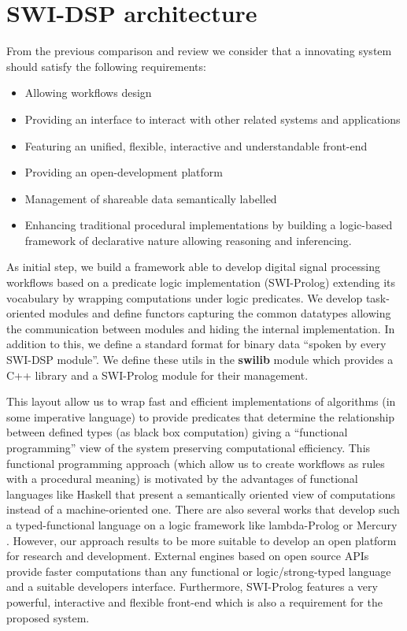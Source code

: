\documentclass[runningheads]{llncs}
\begin{document}
\section{SWI-DSP architecture}\label{sec:architecture}

From the previous comparison and review we consider that a innovating system should satisfy the following requirements:

\begin{itemize}
 \item Allowing workflows design
 \item Providing an interface to interact with other related systems and applications
 \item Featuring an unified, flexible, interactive and understandable front-end
 \item Providing an open-development platform
 \item Management of shareable data semantically labelled
 \item Enhancing traditional procedural implementations by building a logic-based framework of declarative nature allowing reasoning and inferencing.
\end{itemize}

As initial step, we build a framework able to develop digital signal processing workflows based on a predicate logic implementation (SWI-Prolog) extending its vocabulary by wrapping computations under logic predicates. We develop task-oriented modules and define functors capturing the common datatypes allowing the communication between modules and hiding the internal implementation. In addition to this, we define a standard format for binary data ``spoken by every SWI-DSP module''. We define these utils in the \textbf{swilib} module which provides a C++ library and a SWI-Prolog module for their management.

This layout allow us to wrap fast and efficient implementations of algorithms (in some imperative language) to provide predicates that determine the relationship between defined types (as black box computation) giving a ``functional programming'' view of the system preserving computational efficiency. This functional programming approach (which allow us to create workflows as rules with a procedural meaning) is motivated by the advantages of functional languages like Haskell \cite{haskell} that present a semantically oriented view of computations instead of a machine-oriented one. There are also several works that develop such a typed-functional language on a logic framework like lambda-Prolog or Mercury \cite{mercury}. However, our approach results to be more suitable to develop an open platform for research and development. External engines based on open source APIs provide faster computations than any functional or logic/strong-typed language and a suitable developers interface. Furthermore, SWI-Prolog features a very powerful, interactive and flexible front-end which is also a requirement for the proposed system.
\end{document}
